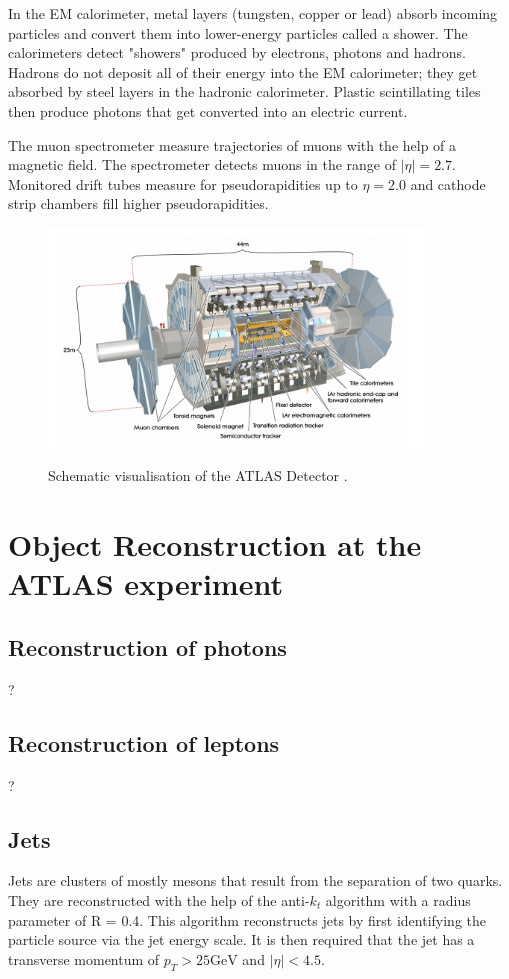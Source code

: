 In the EM calorimeter, metal layers (tungsten, copper or lead) absorb incoming particles and convert them into lower-energy particles called a shower. The calorimeters detect "showers" produced by electrons, photons and hadrons. 
Hadrons do not deposit all of their energy into the EM calorimeter; they get absorbed by steel layers in the hadronic calorimeter. 
Plastic scintillating tiles then produce photons that get converted into an electric current. 

The muon spectrometer measure trajectories of muons with the help of a magnetic field. The spectrometer detects muons in the range of $\bigl|\eta\bigr| = 2.7$. 
Monitored drift tubes measure for pseudorapidities up to $\eta = 2.0$ and cathode strip chambers fill higher pseudorapidities.  
\begin{figure}
    \centering
    \includegraphics[width=0.9\textwidth]{Plots/atlasSCHEMA.PNG}
    \label{fig:atlasschema}
    \caption{Schematic visualisation of the ATLAS Detector \cite{Collaboration_2008}.}
\end{figure}



\section{Object Reconstruction at the ATLAS experiment}

\subsection{Reconstruction of photons}
\label{sec:reconphoton}
?
\subsection{Reconstruction of leptons}
\label{sec:reconlepton}
?
\subsection{Jets}
\label{sec:jets}
Jets are clusters of mostly mesons that result from the separation of two quarks. They are reconstructed with the help of the anti-$k_t$ algorithm \cite{anti_k_t} with a radius parameter of R = 0.4. 
This algorithm reconstructs jets by first identifying the particle source via the jet energy scale. It is then required that the jet has a transverse momentum of $p_T > 25 \si{\giga\electronvolt}$ and $\bigl|\eta\bigr| < 4.5$. 

